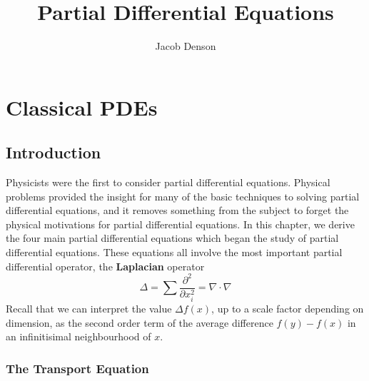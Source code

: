 

\title{Partial Differential Equations}
\author{Jacob Denson}




\maketitle

\tableofcontents


\part{Classical PDEs}

\chapter{Introduction}

Physicists were the first to consider partial differential equations. Physical problems provided the insight for many of the basic techniques to solving partial differential equations, and it removes something from the subject to forget the physical motivations for partial differential equations. In this chapter, we derive the four main partial differential equations which began the study of partial differential equations. These equations all involve the most important partial differential operator, the {\bf Laplacian} operator
%
\[ \Delta = \sum \frac{\partial^2}{\partial x_i^2} = \nabla \cdot \nabla \]
%
Recall that we can interpret the value $\Delta f(x)$, up to a scale factor depending on dimension, as the second order term of the average difference $f(y) - f(x)$ in an infinitisimal neighbourhood of $x$.

\section{The Transport Equation}

